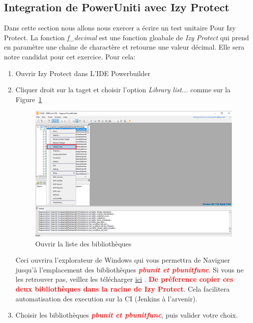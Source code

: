 \documentclass[french]{article}
\theoremstyle{definition}
\begin{document}
\subsection{Integration de PowerUniti avec Izy Protect}
Dans cette section nous allons nous exercer a écrire un test unitaire Pour Izy Protect.
La fonction \textit{f\_decimal} est une fonction gloabale de \textit{Izy Protect} qui prend en paramètre une chaîne de charactère et retourne une valeur décimal.
Elle sera notre candidat pour cet exercice. 
   Pour cela:
\begin{enumerate}
    \item Ouvrir Izy Protect dans L'IDE Powerbuilder
    \item Cliquer droit sur la taget et choisir l'option \textit{Library list...} comme sur la Figure~\ref{fig:librarylist}
    \begin{figure}[!htbp]
        \begin{center}
        \includegraphics[width=1\linewidth]{./librarylist.png}
        \caption{Ouvrir la liste des bibliothèques}
        \label{fig:librarylist}
        \end{center}
      \end{figure} 
Ceci ouvrira l'explorateur de Windows qui vous permettra de Naviguer jusqu'à l'emplacement des bibliothèques \textcolor{red}{\textit{\textbf{pbunit et pbunitfunc}}}. 
Si vous ne les retrouver pas, veillez les télécharger \href{https://github.com/mahugnon/PowerUnitHonore.git}{ ici} .
\textbf{\textcolor{red}{ De préference copier ces deux bibliothèques dans la racine de Izy Protect}}. 
Cela facilitera automatisation des execution sur la CI (Jenkins à l'arvenir).
\item Choisir les bibliothèques \textcolor{red}{\textit{\textbf{pbunit et pbunitfunc}}}, puis valider votre choix.

\end{enumerate}
\end{document}
